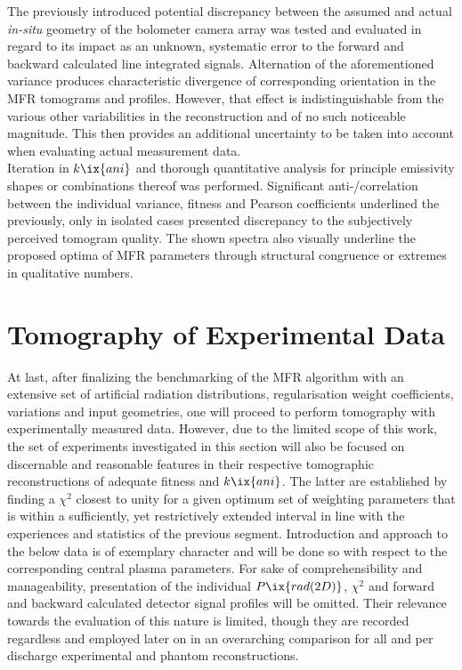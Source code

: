                 The previously introduced potential discrepancy between the assumed and actual \textit{in-situ} geometry of the bolometer camera array was tested and evaluated in regard to its impact as an unknown, systematic error to the forward and backward calculated line integrated signals. Alternation of the aforementioned variance produces characteristic divergence of corresponding orientation in the MFR tomograms and profiles. However, that effect is indistinguishable from the various other variabilities in the reconstruction and of no such noticeable magnitude. This then provides an additional uncertainty to be taken into account when evaluating actual measurement data.\\%
                Iteration in $k\ix{ani}$ and thorough quantitative analysis for principle emissivity shapes or combinations thereof was performed. Significant anti-/correlation between the individual variance, fitness and Pearson coefficients underlined the previously, only in isolated cases presented discrepancy to the subjectively perceived tomogram quality. The shown spectra also visually underline the proposed optima of MFR parameters through structural congruence or extremes in qualitative numbers.%
%
    \section{Tomography of Experimental Data}\label{sec:expdata}%
%
        At last, after finalizing the benchmarking of the MFR algorithm with an extensive set of artificial radiation distributions, regularisation weight coefficients, variations and input geometries, one will proceed to perform tomography with experimentally measured data. However, due to the limited scope of this work, the set of experiments investigated in this section will also be focused on discernable and reasonable features in their respective tomographic reconstructions of adequate fitness and $k\ix{ani}$. The latter are established by finding a $\chi^{2}$ closest to unity for a given optimum set of weighting parameters that is within a sufficiently, yet restrictively extended interval in line with the experiences and statistics of the previous segment. Introduction and approach to the below data is of exemplary character and will be done so with respect to the corresponding central plasma parameters. For sake of comprehensibility and manageability, presentation of the individual $P\ix{rad(2D)}$, $\chi^{2}$ and forward and backward calculated detector signal profiles will be omitted. Their relevance towards the evaluation of this nature is limited, though they are recorded regardless and employed later on in an overarching comparison for all and per discharge experimental and phantom reconstructions.%
%
